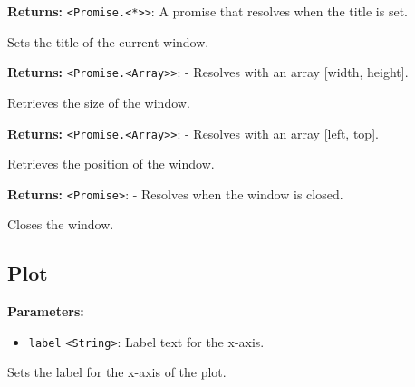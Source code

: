 \documentclass[12pt,a4paper]{article}
\begin{document}
\noindent \textbf{Returns:} \texttt{<Promise.<*>>}: A promise that resolves when the title is set.

\noindent Sets the title of the current window.

\vspace{5mm}
\noindent {}


\noindent \textbf{Returns:} \texttt{<Promise.<Array>>}: - Resolves with an array [width, height].

\noindent Retrieves the size of the window.

\vspace{5mm}
\noindent {}


\noindent \textbf{Returns:} \texttt{<Promise.<Array>>}: - Resolves with an array [left, top].

\noindent Retrieves the position of the window.

\vspace{5mm}
\noindent {}


\noindent \textbf{Returns:} \texttt{<Promise>}: - Resolves when the window is closed.

\noindent Closes the window.


\subsection{Plot}
\vspace{5mm}
\noindent {}


\noindent \textbf{Parameters:}
\begin{itemize}
  \item \texttt{label} \texttt{<String>}: Label text for the x-axis.
\end{itemize}

\noindent Sets the label for the x-axis of the plot.

\vspace{5mm}
\noindent {}
\end{document}
